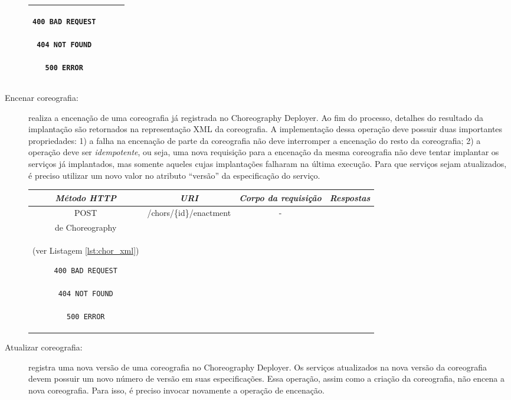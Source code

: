 \begin{description}
{\begin{tabular}{|c|c|c|c|}
\begin{minipage}{2in}
\begin{verbatim}
400 BAD REQUEST

404 NOT FOUND

500 ERROR

\end{verbatim}
\end{minipage} 
\\ 
\hline 
\end{tabular}
}

\item [Encenar coreografia:] realiza a encenação de uma coreografia já registrada no Choreography Deployer. Ao fim do processo, detalhes do resultado da implantação são retornados na representação XML da coreografia. A implementação dessa operação deve possuir duas importantes propriedades: 1) a falha na encenação de parte da coreografia não deve interromper a encenação do resto da coreografia; 2) a operação deve ser \emph{idempotente}, ou seja, uma nova requisição para a encenação da mesma coreografia não deve tentar implantar os serviços já implantados, mas somente aqueles cujas implantações falharam na última execução. Para que serviços sejam atualizados, é preciso utilizar um novo valor no atributo ``versão'' da especificação do serviço.

{\small
\begin{tabular}{|c|c|c|c|}
\hline 
\itshape{Método HTTP} & \itshape{URI} & \itshape{Corpo da requisição} & \itshape{Respostas} \\ 
\hline 
POST & /chors/\{id\}/enactment & - &
\begin{minipage}{2in}
\begin{verbatim}

200 OK
location = "/chors/{id}"
Corpo: 
\end{verbatim}
Representação XML \\ de \textsf{Choreography}\\ 
(ver Listagem \ref{lst:chor_xml})

\begin{verbatim}
400 BAD REQUEST

404 NOT FOUND

500 ERROR

\end{verbatim}
\end{minipage} 
\\ 
\hline 
\end{tabular} 
}

\item [Atualizar coreografia:] registra uma nova versão de uma coreografia no Choreography Deployer. Os serviços atualizados na nova versão da coreografia devem possuir um novo número de versão em suas especificações. Essa operação, assim como a criação da coreografia, não encena a nova coreografia. Para isso, é preciso invocar novamente a operação de encenação.


\end{description}
